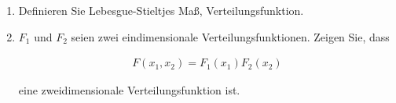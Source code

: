 
\begin{exercise}

\phantom{}

\begin{enumerate}[label = (\alph*)]

  \item
  Definieren Sie Lebesgue-Stieltjes Maß, Verteilungsfunktion.
  
  \item
  $F_1$ und $F_2$ seien zwei eindimensionale Verteilungsfunktionen. Zeigen Sie, dass
  
  \begin{align*}
    F(x_1, x_2) = F_1(x_1) F_2(x_2)
  \end{align*}
  
  eine zweidimensionale Verteilungsfunktion ist.

\end{enumerate}

\end{exercise}


